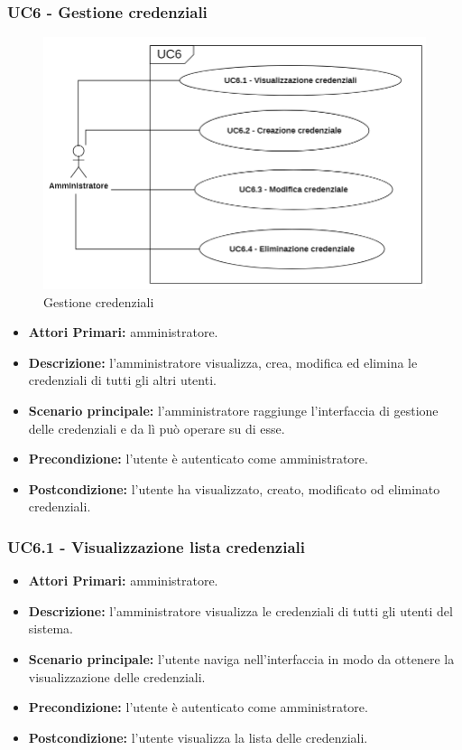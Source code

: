\subsubsection{ UC6 - Gestione credenziali}
\begin{figure}[H]
	\centering
	\includegraphics[width=15cm]{res/images/UC6.png}
	\caption{Gestione credenziali}
	\label{fig:Gestione credenziali}
\end{figure}
\begin{itemize}
           	\item\textbf{Attori Primari:}
           	amministratore.
           	\item\textbf{Descrizione:} 
           	l'amministratore visualizza, crea, modifica ed elimina le credenziali di tutti gli altri utenti.
           	\item\textbf{Scenario principale:} 
           	l'amministratore raggiunge l'interfaccia di gestione delle credenziali e da lì può operare su di esse.
           	\item\textbf{Precondizione:} 
           	l'utente è autenticato come amministratore.
           	\item\textbf{Postcondizione:}
           	l'utente ha visualizzato, creato, modificato od eliminato credenziali.
\end{itemize}

\subsubsection{ UC6.1 - Visualizzazione lista credenziali}
\begin{itemize}
	\item\textbf{Attori Primari:} 
	amministratore.
	\item\textbf{Descrizione:} 
	l'amministratore visualizza le credenziali di tutti gli utenti del sistema.
	\item\textbf{Scenario principale:} 
	l'utente naviga nell'interfaccia in modo da ottenere la visualizzazione delle credenziali.
	\item\textbf{Precondizione:} 
	l'utente è autenticato come amministratore.
	\item\textbf{Postcondizione:}
	l'utente visualizza la lista delle credenziali.
\end{itemize}

